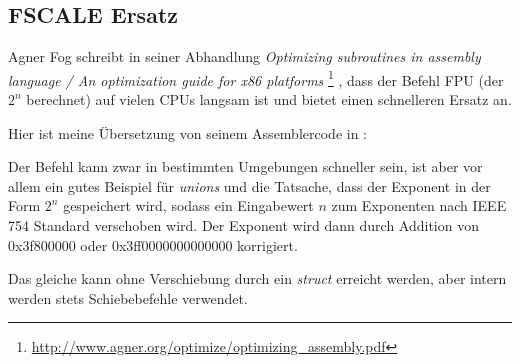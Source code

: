 \subsection{FSCALE Ersatz}
Agner Fog schreibt in seiner Abhandlung \emph{Optimizing subroutines in assembly language / An optimization guide for x86
platforms} \footnote{\url{http://www.agner.org/optimize/optimizing_assembly.pdf}} , dass der Befehl 
\ac{FPU} (der $2^n$ berechnet) auf vielen CPUs langsam ist und bietet einen schnelleren Ersatz an.

Hier ist meine Übersetzung von seinem Assemblercode in \CCpp:


Der Befehl  kann zwar in bestimmten Umgebungen schneller sein, ist aber vor allem ein gutes Beispiel für
\emph{unions} und die Tatsache, dass der Exponent in der Form $2^n$ gespeichert wird, sodass ein Eingabewert $n$ zum
Exponenten nach IEEE 754 Standard verschoben wird.
Der Exponent wird dann durch Addition von 0x3f800000 oder 0x3ff0000000000000 korrigiert.

Das gleiche kann ohne Verschiebung durch ein \emph{struct} erreicht werden, aber intern werden stets Schiebebefehle
verwendet.
